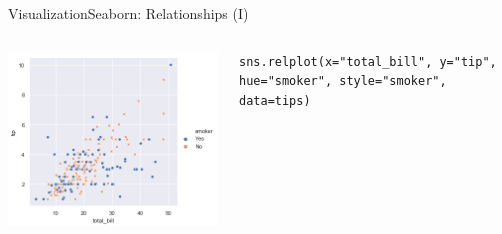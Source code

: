 \documentclass[10pt,compress]{beamer} %
\begin{document}
\begin{frame}[fragile]{Visualization}{Seaborn: Relationships (I)}
\begin{columns}[t]
	\includegraphics[width=\textwidth]{figs/sns-scatterplot2.png}\\
	\begin{exampleblock}{}
	\vspace{-0.2cm} 
	\begin{lstlisting}[basicstyle=\tiny]
	sns.relplot(x="total_bill", y="tip", hue="smoker", style="smoker", data=tips)
	\end{lstlisting}
	\vspace{-0.2cm} 
	\end{exampleblock}


\end{columns}
\end{frame}
\end{document}
